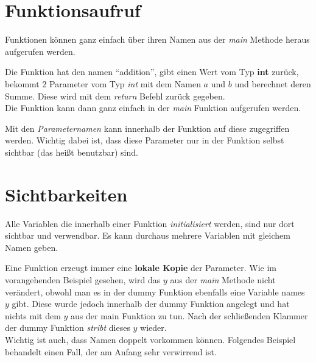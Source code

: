 \documentclass[c_worksheet.tex]{subfiles}
\begin{document}
\section{Funktionsaufruf} 

Funktionen können ganz einfach über ihren Namen aus der \emph{main} Methode heraus aufgerufen werden.

 

Die Funktion hat den namen ``addition'', gibt einen Wert vom Typ \textbf{int} zurück, bekommt 2 Parameter vom Typ \emph{int} mit dem Namen \(a\) und \(b\) und berechnet deren Summe. Diese wird mit dem \emph{return} Befehl zurück gegeben.\\
Die Funktion kann dann ganz einfach in der \emph{main} Funktion aufgerufen werden.

 

Mit den \emph{Parameternamen} kann innerhalb der Funktion auf diese zugegriffen werden. Wichtig dabei ist, dass diese Parameter nur in der Funktion selbst sichtbar (das heißt benutzbar) sind.



\section{Sichtbarkeiten} 

Alle Variablen die innerhalb einer Funktion \emph{initialisiert} werden, sind nur dort sichtbar und verwendbar. Es kann durchaus mehrere Variablen mit gleichem Namen geben.

 

 Eine Funktion erzeugt immer eine \textbf{lokale Kopie} der Parameter. Wie im vorangehenden Beispiel gesehen, wird das \(y\) aus der \emph{main} Methode nicht verändert, obwohl man es in der dummy Funktion ebenfalls eine Variable names \(y\) gibt. Diese wurde jedoch innerhalb der dummy Funktion angelegt und hat nichts mit dem \(y\) aus der main Funktion zu tun. Nach der schließenden Klammer der dummy Funktion \emph{stribt} dieses \(y\) wieder. \\

 Wichtig ist auch, dass Namen doppelt vorkommen können. Folgendes Beispiel behandelt einen Fall, der am Anfang sehr verwirrend ist.

  
\end{document}
